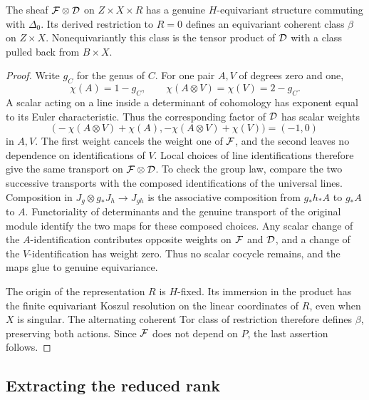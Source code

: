 \begin{lemma}\label{lem:determinant-descent}
The sheaf \(\mathcal F\otimes\mathcal D\) on \(Z\times X\times R\) has a
genuine \(H\)-equivariant structure commuting with \(\Delta_0\).
Its derived restriction to \(R=0\) defines an equivariant coherent
class \(\beta\) on \(Z\times X\).
Nonequivariantly this class is the tensor product of \(\mathcal D\) with
a class pulled back from \(B\times X\).
\end{lemma}
\begin{proof}
Write \(g_C\) for the genus of \(C\).  For one pair \(A,V\) of
degrees zero and one,
\[
\chi(A)=1-g_C,\qquad
\chi(A\otimes V)=\chi(V)=2-g_C.
\]
A scalar acting on a line inside a determinant of cohomology has
exponent equal to its Euler characteristic.  Thus the corresponding
factor of \(\mathcal D\) has scalar weights
\[
\bigl(-\chi(A\otimes V)+\chi(A),
      -\chi(A\otimes V)+\chi(V)\bigr)=(-1,0)
\]
in \(A,V\).  The first weight cancels the weight one of \(\mathcal F\),
and the second leaves no dependence on identifications of \(V\).
Local choices of line identifications therefore give the same
transport on \(\mathcal F\otimes\mathcal D\). To check the group law, compare the
two successive transports with the composed identifications of the
universal lines. Composition in
\(J_g\otimes g_*J_h\longrightarrow J_{gh}\) is the associative
composition from \(g_*h_*A\) to \(g_*A\) to \(A\).
Functoriality of determinants and the genuine transport of the original
module identify the two maps for these composed choices. Any scalar
change of the \(A\)-identification contributes opposite weights on
\(\mathcal F\) and \(\mathcal D\), and a change of the \(V\)-identification has
weight zero. Thus no scalar cocycle remains, and the maps glue to
genuine equivariance.

The origin of the representation \(R\) is \(H\)-fixed.  Its
immersion in the product has the finite equivariant Koszul
resolution on the linear coordinates of \(R\), even when \(X\)
is singular.  The alternating coherent Tor class of restriction
therefore defines \(\beta\), preserving both actions.  Since
\(\mathcal F\) does not depend on \(P\), the last assertion follows.
\end{proof}

\subsection{Extracting the reduced rank}


